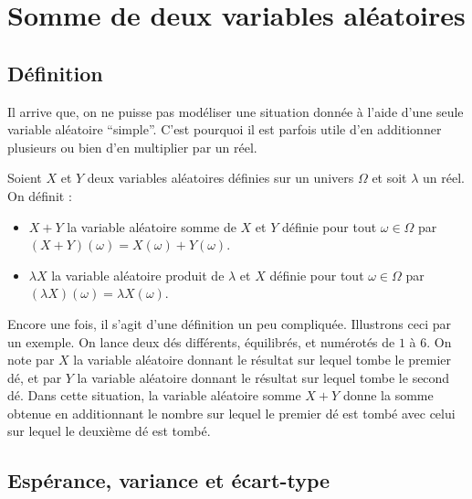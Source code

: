 



	\section{Somme de deux variables aléatoires}

	\subsection{Définition}

	Il arrive que, on ne puisse pas modéliser une situation donnée à l'aide d'une seule variable aléatoire ``simple''. C'est pourquoi il est parfois utile d'en additionner plusieurs ou bien d'en multiplier par un réel.

	\begin{formula}[Définition]
		Soient $X$ et $Y$ deux variables aléatoires définies sur un univers $\Omega$ et soit $\lambda$ un réel. On définit :
		\begin{itemize}
			\item $X + Y$ la variable aléatoire somme de $X$ et $Y$ définie pour tout $\omega \in \Omega$ par $(X + Y)(\omega) = X(\omega) + Y(\omega)$.
			\item $\lambda X$ la variable aléatoire produit de $\lambda$ et $X$ définie pour tout $\omega \in \Omega$ par $(\lambda X)(\omega) = \lambda X(\omega)$.
		\end{itemize}
	\end{formula}

	\begin{tip}[Exemple]
		Encore une fois, il s'agit d'une définition un peu compliquée. Illustrons ceci par un exemple.
		\newpar
		On lance deux dés différents, équilibrés, et numérotés de $1$ à $6$. On note par $X$ la variable aléatoire donnant le résultat sur lequel tombe le premier dé, et par $Y$ la variable aléatoire donnant le résultat sur lequel tombe le second dé.
		\newpar
		Dans cette situation, la variable aléatoire somme $X + Y$ donne la somme obtenue en additionnant le nombre sur lequel le premier dé est tombé avec celui sur lequel le deuxième dé est tombé.
	\end{tip}

	\subsection{Espérance, variance et écart-type}


